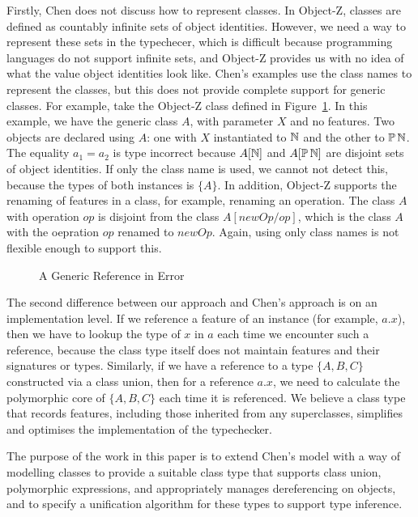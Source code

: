 Firstly, Chen does not discuss how to represent classes. In Object-Z,
classes are defined as countably infinite sets of object
identities. However, we need a way to represent these sets in the
typechecer, which is difficult because programming languages do not
support infinite sets, and Object-Z provides us with no idea of what
the value object identities look like. Chen's examples use the class
names to represent the classes, but this does not provide complete
support for generic classes. For example, take the Object-Z class
defined in Figure~\ref{generic-class-A}.  In this example, we have the
generic class $A$, with parameter $X$ and no features.  Two objects
are declared using $A$: one with $X$ instantiated to ${\mathbb N}$ and the
other to $\power \nat$. The equality $a_{1} = a_{2}$ is type incorrect
because $A[{\mathbb N}]$ and $A[\power \nat]$ are disjoint sets of object
identities. If only the class name is used, we cannot not detect this,
because the types of both instances is $\{A\}$. In addition, Object-Z
supports the renaming of features in a class, for example, renaming an
operation. The class $A$ with operation $op$ is disjoint from the
class $A[newOp/op]$, which is the class $A$ with the oepration $op$
renamed to $newOp$. Again, using only class names is not flexible
enough to support this.

\begin{figure}[t]

\caption{A Generic Reference in Error}
\label{generic-class-A}
\end{figure}


The second difference between our approach and Chen's approach is on
an implementation level. If we reference a feature of an instance (for
example, $a.x$), then we have to lookup the type of $x$ in $a$ each
time we encounter such a reference, because the class type itself does
not maintain features and their signatures or types.  Similarly, if we
have a reference to a type $\{ A, B, C\}$ constructed via a class
union, then for a reference $a.x$, we need to calculate the
polymorphic core of $\{A,B,C\}$ each time it is referenced. We believe
a class type that records features, including those inherited from any
superclasses, simplifies and optimises the implementation of the
typechecker.

The purpose of the work in this paper is to extend Chen's model with a
way of modelling classes to provide a suitable class type that
supports class union, polymorphic expressions, and appropriately
manages dereferencing on objects, and to specify a unification
algorithm for these types to support type inference.
